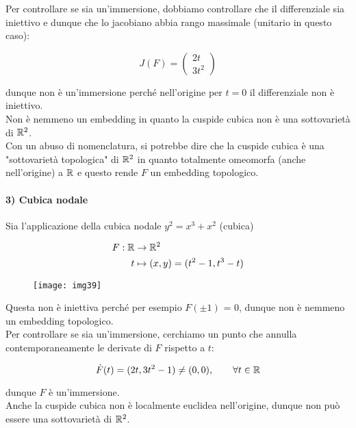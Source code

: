 Per controllare se sia un'immersione, dobbiamo controllare che il differenziale sia iniettivo e dunque che lo jacobiano abbia rango massimale (unitario in questo caso):

\begin{equation}
	J(F) = \begin{pmatrix} 2t \\ 3t^{2} \end{pmatrix}
\end{equation}

dunque non è un'immersione perché nell'origine per $ t=0 $ il differenziale non è iniettivo.\\
Non è nemmeno un embedding in quanto la cuspide cubica non è una sottovarietà di $ \mathbb{R}^{2} $.\\
Con un abuso di nomenclatura, si potrebbe dire che la cuspide cubica è una "sottovarietà topologica" di $ \mathbb{R}^{2} $ in quanto totalmente omeomorfa (anche nell'origine) a $ \mathbb{R} $ e questo rende $ F $ un embedding topologico.

\paragraph{3) Cubica nodale}

Sia l'applicazione della cubica nodale $ y^{2} = x^{3} + x^{2} $ (cubica)

\begin{align}
	\begin{split}
		F : \mathbb{R} &\to \mathbb{R}^{2}\\
		t &\mapsto (x,y) = (t^{2}-1,t^{3}-t)
	\end{split}
\end{align}

\begin{figure}[H]
	\centering
	\texttt{[image: img39]}
\end{figure}

Questa non è iniettiva perché per esempio $ F(\pm 1) $ = 0, dunque non è nemmeno un embedding topologico.\\
Per controllare se sia un'immersione, cerchiamo un punto che annulla contemporaneamente le derivate di $ F $ rispetto a $ t $:

\begin{equation}
	\dot{F}(t) = (2t, 3 t^{2} - 1) \neq (0,0), \qquad \forall t \in \mathbb{R}
\end{equation}

dunque $ F $ è un'immersione.\\
Anche la cuspide cubica non è localmente euclidea nell'origine, dunque non può essere una sottovarietà di $ \mathbb{R}^{2} $.

